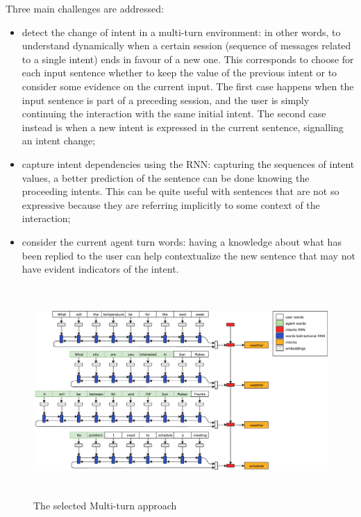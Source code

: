 Three main challenges are addressed:

\begin{itemize}
	\item detect the change of intent in a multi-turn environment: in other words, to understand dynamically when a certain session (sequence of messages related to a single intent) ends in favour of a new one. This corresponds to choose for each input sentence whether to keep the value of the previous intent or to consider some evidence on the current input. The first case happens when the input sentence is part of a preceding session, and the user is simply continuing the interaction with the same initial intent. The second case instead is when a new intent is expressed in the current sentence, signalling an intent change;

	\item capture intent dependencies using the RNN: capturing the sequences of intent values, a better prediction of the sentence can be done knowing the proceeding intents. This can be quite useful with sentences that are not so expressive because they are referring implicitly to some context of the interaction;

	\item consider the current agent turn words: having a knowledge about what has been replied to the user can help contextualize the new sentence that may not have evident indicators of the intent.
\end{itemize}

\begin{figure}[!htbp]
    \centering
    \includegraphics[max width=\linewidth,max height=8cm,keepaspectratio]{figures/approachMultiTurn}
    \caption{The selected Multi-turn approach}\label{fig:approachMultiTurn}
\end{figure}

